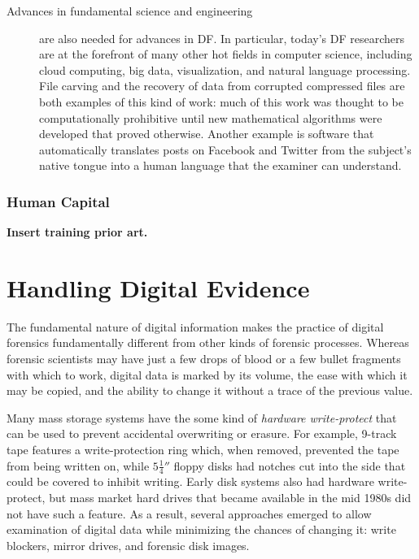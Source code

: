 \documentclass[11pt,letter]{article}
\begin{document}
\begin{description}
\item[Advances in fundamental science and engineering] are also needed
  for advances in DF. In particular, today's DF researchers are at the
  forefront of many other hot fields in computer science, including
  cloud computing, big data, visualization, and natural language
  processing. File carving and the recovery of data from corrupted
  compressed files are both examples of this kind of work: much of
  this work was thought to be computationally prohibitive until new
  mathematical algorithms were developed that proved
  otherwise. Another example is software that automatically translates
  posts on Facebook and Twitter from the subject's native tongue into
  a human language that the examiner can understand.
\end{description}


\subsection{Human Capital}

\textbf{Insert training prior art.}



\chapter{Handling Digital Evidence}
The fundamental nature of digital information makes the practice of
digital forensics fundamentally different from other kinds of forensic
processes.  Whereas forensic scientists may have just a few drops of
blood or a few bullet fragments with which to work, digital data is
marked by its volume, the ease with which it may be copied, and the
ability to change it without a trace of the previous value.

Many mass storage systems have the some kind of \emph{hardware
  write-protect} that can be used to prevent accidental overwriting or
erasure. For example, 9-track tape features a
write-protection ring which, when removed, prevented the tape from
being written on, while $5\frac{1}{4}''$ floppy disks had notches cut into
the side that could be covered to inhibit writing. Early disk systems
also had hardware write-protect, but mass market hard drives that
became available in the mid 1980s did not have such a feature. As a
result, several approaches emerged to allow examination of digital
data while minimizing the chances of changing it: write
blockers, mirror drives, and forensic disk images.
\end{document}

